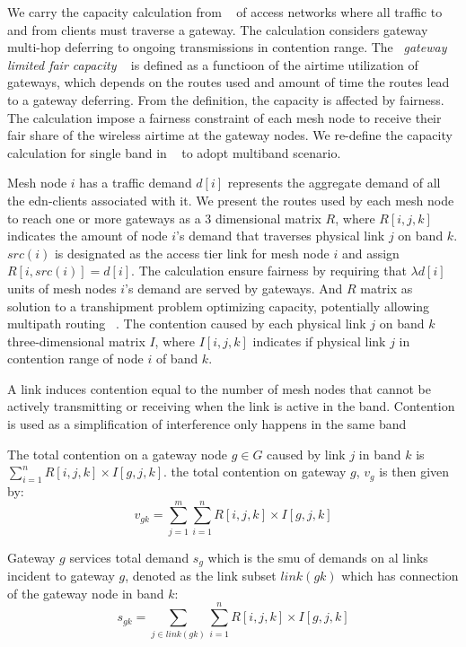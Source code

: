 We carry the capacity calculation from ~\cite{robinson2008adding} of access networks where all traffic to and from clients must traverse a gateway. 
The calculation considers gateway multi-hop deferring to ongoing transmissions in contention range. 
The ~\emph{gateway limited fair capacity} ~\cite{robinson2008adding} is defined as a functioon of the airtime utilization of gateways, which depends on the routes used and amount of time the routes lead to a gateway deferring. From the definition, the capacity is affected by fairness. The calculation impose a fairness constraint of each mesh node to receive their fair share of the wireless airtime at the gateway nodes. 
We re-define the capacity calculation for single band in ~\cite{robinson2008adding} to adopt multiband scenario.

Mesh node $i$ has a traffic demand $d[i]$ represents the aggregate demand of all the edn-clients associated with it. 
We present the routes used by each mesh node to reach one or more gateways as a 3 dimensional matrix $R$, where $R[i,j,k]$ indicates the amount of node $i$'s demand that traverses physical link $j$ on band $k$. 
$src(i)$ is designated as the access tier link for mesh node $i$ and assign $R[i,src(i)]=d[i]$. The calculation ensure fairness by requiring that $\lambda d[i]$ units of mesh nodes $ i$'s demand are served by gateways.
And $R$ matrix as solution to a transhipment problem optimizing capacity, potentially allowing multipath routing ~\cite{robinson2008adding}.
The contention caused by each physical link $j$ on band $k$ three-dimensional matrix $I$, where $I[i,j,k]$ indicates if physical link $j$  in contention range of node $i$ of band $k$.

A link induces contention equal to the number of mesh nodes that cannot be actively transmitting or receiving when the link is active in the band.
Contention is used as a simplification of interference only happens in the same band 

The total contention on a gateway node $g\in G$ caused by link $j$ in band $k$ is $\sum_{i=1}^nR[i,j,k] \times I[g,j,k]$. the total contention on gateway $g$, $v_g$ is then given by:
\begin{equation}
\label{eq:contention}
v_{gk}=\sum_{j=1}^m \sum_{i=1}^n R[i,j,k]\times I[g,j,k]
\end{equation}

Gateway $g$ services total demand $s_g$ which is the smu of demands on al links incident to gateway $g$, denoted as the link subset $link(gk)$ which has connection of the gateway node in band $k$:
\begin{equation}
s_{gk}=\sum_{j\in link(gk)} \sum_{i=1}^n R[i,j,k]\times I[g,j,k]
\end{equation}
 
